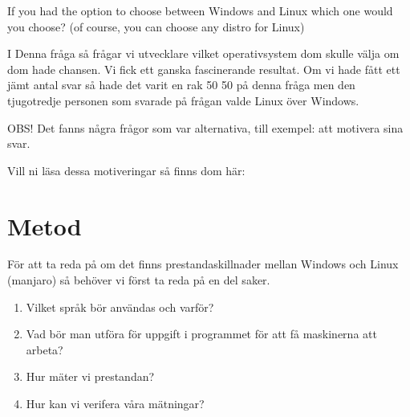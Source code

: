 \documentclass[12pt, a4paper]{report}
\begin{document}
 
   \vspace{1cm}
 
 
   \cite{form}
   \vspace{3cm}
 
   \large{If you had the option to choose between Windows and Linux which one would you choose? (of course, you can choose any distro for Linux)}
  
   \vspace{.5cm}
  
   \normalsize I Denna fråga så frågar vi utvecklare vilket operativsystem dom skulle välja om dom hade chansen. Vi fick ett ganska fascinerande resultat. Om vi hade fått ett jämt antal svar så hade det varit en rak 50 50 på denna fråga men den tjugotredje personen som svarade på frågan valde Linux över Windows.
 
   \vspace{1cm}
 
 
   \cite{form}
 
   \vspace{1cm}
 
 
   \small{OBS! Det fanns några frågor som var alternativa, till exempel: att motivera sina svar.
  
   Vill ni läsa dessa motiveringar så finns dom här:} 
 
 
\section{Metod}
 
För att ta reda på om det finns prestandaskillnader mellan Windows och Linux (manjaro) så behöver vi först ta reda på en del saker.
 
\begin{enumerate}
   \item Vilket språk bör användas och varför?
   \item Vad bör man utföra för uppgift i programmet för att få maskinerna att arbeta?
   \item Hur mäter vi prestandan?
   \item Hur kan vi verifera våra mätningar?
\end{enumerate}
 
\end{document}
